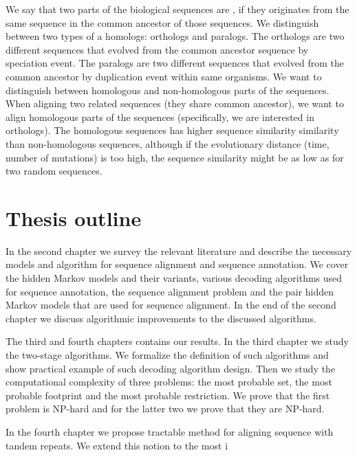We say that two parts of the biological sequences are ,
if they originates from the same sequence in the common ancestor of those
sequences. We distinguish between two types of a homologs: orthologs and
paralogs. The orthologs are two different sequences that evolved from the
common ancestor sequence by speciation event. The paralogs are two different
sequences that evolved from the common ancestor by duplication event within
same organisms. We want to distinguish between homologous and non-homologous
parts of the sequences. When aligning two related sequences (they share common
ancestor), we want to align homologous parts of the sequences (specifically, we
are interested in orthologs). The homologous sequences has higher sequence
similarity similarity than non-homologous sequences, although if the
evolutionary distance (time, number of mutations) is too high, the sequence
similarity might be as low as for two random sequences.

\section{Thesis outline}


In the second chapter we survey the relevant literature and describe the
necessary models and algorithm for sequence alignment and sequence annotation.
We cover the hidden Markov models and their variants, various decoding
algorithms used for sequence annotation, the sequence alignment problem and the
pair hidden Markov models that are used for sequence alignment.  In the end of
the second chapter we discuss algorithmic improvements to the discussed
algorithms.

The third and fourth chapters contains our results. In the third chapter we
study the two-stage algorithms. We formalize the definition of such algorithms
and show practical example of such decoding algorithm design. Then we study the
computational complexity of three problems: the most probable set, the most
probable footprint and the most probable restriction. We prove that the first
problem is NP-hard and for the latter two we prove that they are NP-hard. 

In the fourth chapter we propose tractable method for aligning sequence with
tandem repeats. We extend this notion to the most i

